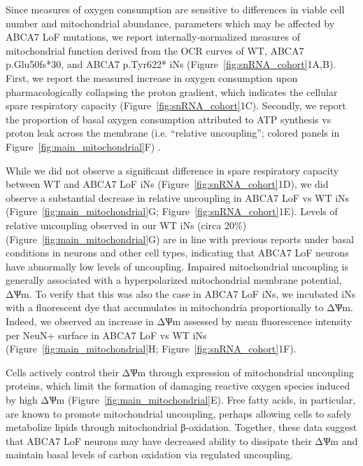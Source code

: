 Since measures of oxygen consumption are sensitive to differences in viable cell number and mitochondrial abundance\cite{Divakaruni2014-eq,Gu2021-ms}, parameters which may be affected by ABCA7 LoF mutations, we report internally-normalized measures of mitochondrial function derived from the OCR curves\cite{Divakaruni2022-rj} of WT, ABCA7 p.Glu50fs*30, and ABCA7 p.Tyr622* iNs (Figure~\ref{fig:snRNA_cohort}1A,B).  First, we  report the measured increase in oxygen consumption upon pharmacologically collapsing the proton gradient, which indicates the cellular spare respiratory capacity \cite{Divakaruni2022-rj}(Figure~\ref{fig:snRNA_cohort}1C).  Secondly, we report the proportion of basal oxygen consumption attributed to ATP synthesis vs proton leak across the membrane  (i.e. “relative uncoupling”; colored panels in Figure~\ref{fig:main_mitochondrial}F) \cite{Divakaruni2014-eq}. 

While we did not observe a significant difference in spare respiratory capacity between WT and ABCA7 LoF iNs (Figure~\ref{fig:snRNA_cohort}1D), we did observe a substantial decrease in relative uncoupling in ABCA7 LoF vs WT iNs (Figure~\ref{fig:main_mitochondrial}G; Figure~\ref{fig:snRNA_cohort}1E). Levels of relative uncoupling observed in our WT iNs (circa 20\%) (Figure~\ref{fig:main_mitochondrial}G) are in line with previous reports under basal conditions in neurons and other cell types\cite{Divakaruni2011-uj,Jekabsons2004-fn}, indicating that ABCA7 LoF neurons have abnormally low levels of uncoupling. Impaired mitochondrial uncoupling is generally associated with a hyperpolarized mitochondrial membrane potential, ΔѰm\cite{Demine2019-qj,Zorov2021-dq}. To verify that this was also the case in ABCA7 LoF iNs, we incubated iNs with a fluorescent dye that accumulates in mitochondria proportionally to ΔѰm. Indeed, we observed an increase in ΔѰm assessed by mean fluorescence intensity per NeuN+ surface in ABCA7 LoF vs WT iNs (Figure~\ref{fig:main_mitochondrial}H; Figure~\ref{fig:snRNA_cohort}1F). 

Cells actively control their ΔѰm through expression of mitochondrial uncoupling proteins\cite{noauthor_2021-tx,noauthor_2021-im}, which limit the formation of damaging reactive oxygen species induced by high ΔѰm\cite{Suski2012-zo} (Figure~\ref{fig:main_mitochondrial}E). Free fatty acids, in particular, are known to promote mitochondrial uncoupling\cite{Hoang2015-vm,noauthor_1999-dt,Ardalan2022-bk}, perhaps allowing cells to safely metabolize lipids through mitochondrial β-oxidation. Together, these data suggest that ABCA7 LoF neurons may have decreased ability to dissipate their ΔѰm and maintain basal levels of carbon oxidation via regulated uncoupling. 

